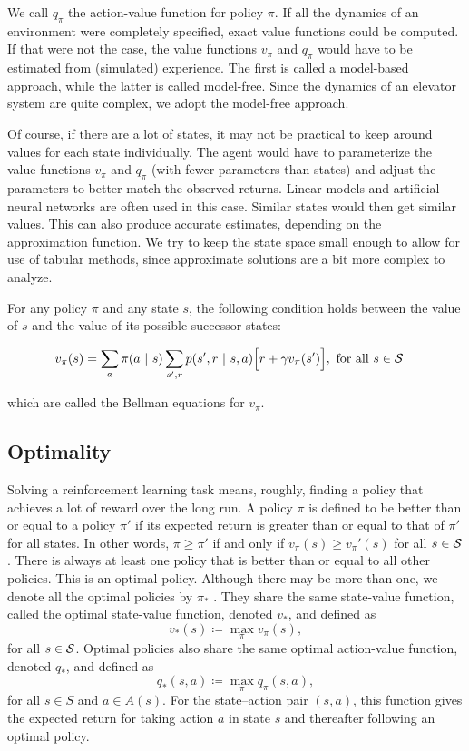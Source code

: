 We call $q_\pi$ the action-value function for policy $\pi$. If all the dynamics of an environment were completely specified, exact value functions could be computed. If that were not the case, the value functions $v_\pi$ and $q_\pi$ would have to be estimated from (simulated) experience. The first is called a model-based approach, while the latter is called model-free. Since the dynamics of an elevator system are quite complex, we adopt the model-free approach.

Of course, if there are a lot of states, it may not be practical to keep around values for each state individually. The agent would have to parameterize the value functions $v_\pi$ and $q_\pi$ (with fewer parameters than states) and adjust the parameters to better match the observed returns. Linear models and artificial neural networks are often used in this case. Similar states would then get similar values. This can also produce accurate estimates, depending on the approximation function. We try to keep the state space small enough to allow for use of tabular methods, since approximate solutions are a bit more complex to analyze.

For any policy $\pi$ and any state $s$, the following condition holds between the value of $s$ and the value of its possible successor states:

\begin{align}
    v_\pi(s) &= \sum_a \pi(a\cbar s) \sum_{s', r} p(s', r \cbar s, a)\Bigr[r + \gamma v_{\pi}(s')\Bigr], \text{ for all } s\in \S 
\end{align}

which are called the Bellman equations for $v_\pi$.

\subsection{Optimality}

Solving a reinforcement learning task means, roughly, finding a policy that achieves a lot of reward over the long run.
A policy $\pi$ is defined to be better than or equal to a policy $\pi'$ if its expected return is greater than or equal to that of $\pi'$ for all states. In other words, $\pi \geq \pi'$ if and only if $v_\pi(s) \geq v_\pi'(s)$ for all $s \in \S$. There is always at least one policy that is better than or equal to all other policies. This is an optimal policy. Although there may be more than one, we denote all the optimal policies by $\pi_*$ . They share the same state-value function, called the optimal state-value function, denoted $v_*$, and defined as
\begin{equation}
    v_*(s) \coloneqq \max\limits_{\pi}v_\pi(s),
\end{equation}
for all $s \in \S$.
Optimal policies also share the same optimal action-value function, denoted $q_* $, and defined as
\begin{equation}
    q_*(s, a) \coloneqq \max\limits_{\pi} q_\pi(s, a),
\end{equation}
for all $s \in S$ and $a \in A(s)$. For the state–action pair $(s, a)$, this function gives the expected return for taking action $a$ in state $s$ and thereafter following an optimal policy.

